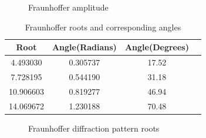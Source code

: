 \documentclass{article}
\begin{document}
\begin{figure}[H]
  \begin{center}
  \end{center}
  \caption{Fraunhoffer amplitude}
  \label{fig:fraun_amp}
\end{figure}

\begin{table}[H]
  \begin{center}
    \begin{tabular}{|c|c|c|c|}
      \hline
      Root & Angle(Radians) & Angle(Degrees) \\
      \hline
      4.493030 & 0.305737 & 17.52 \\
      \hline
      7.728195 & 0.544190 & 31.18 \\
      \hline
      10.906603 & 0.819277 & 46.94 \\
      \hline
      14.069672 & 1.230188 & 70.48 \\
      \hline
    \end{tabular}
  \end{center}
  \caption {Fraunhoffer roots and corresponding angles}
  \label{tab:fraun_roots}
\end{table}

\begin{figure}[H]
  \begin{center}
  \end{center}
  \caption{Fraunhoffer diffraction pattern roots}
  \label{fig:fraun_roots}
\end{figure}
\end{document}

